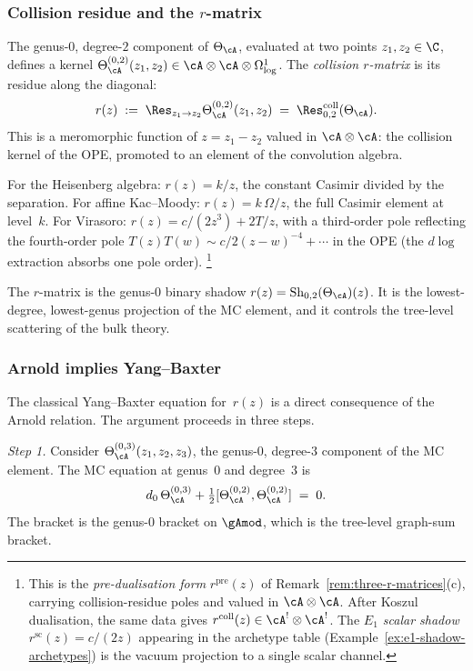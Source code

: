 \subsubsection*{Collision residue and the $r$-matrix}

The genus-$0$, degree-$2$ component of $\Theta_\cA$, evaluated
at two points $z_1,z_2\in\C$, defines a kernel
$\Theta_\cA^{(0,2)}(z_1,z_2)
\in\cA\otimes\cA\otimes\Omega^1_{\mathrm{log}}$.
The \emph{collision $r$-matrix} is its residue along the
diagonal:
\[
r(z)
\;:=\;
\Res_{z_1\to z_2}\Theta_\cA^{(0,2)}(z_1,z_2)
\;=\;
\Res^{\mathrm{coll}}_{0,2}(\Theta_\cA).
\]
This is a meromorphic function of $z=z_1-z_2$ valued in
$\cA\otimes\cA$: the collision kernel of the OPE, promoted to
an element of the convolution algebra.

For the Heisenberg algebra: $r(z)=k/z$, the constant Casimir
divided by the separation. For affine Kac--Moody:
$r(z)=k\,\Omega/z$, the full Casimir element at level~$k$. For Virasoro:
$r(z)=c/(2z^3)+2T/z$, with a third-order pole reflecting the
fourth-order pole $T(z)T(w)\sim c/2(z-w)^{-4}+\cdots$ in the OPE
(the $d\log$ extraction absorbs one pole order).%
\footnote{This is the \emph{pre-dualisation form}
$r^{\mathrm{pre}}(z)$ of
Remark~\textup{\ref{rem:three-r-matrices}}\textup{(c)}, carrying
collision-residue poles and valued in $\cA\otimes\cA$.
After Koszul dualisation, the same data gives
$r^{\mathrm{coll}}(z) \in \cA^!\otimes\cA^!$. The
\emph{$E_1$ scalar shadow} $r^{\mathrm{sc}}(z) = c/(2z)$
appearing in the archetype table
\textup{(}Example~\textup{\ref{ex:e1-shadow-archetypes})}
is the vacuum projection to a single scalar channel.}

The $r$-matrix is the genus-$0$ binary shadow
$r(z)=\mathrm{Sh}_{0,2}(\Theta_\cA)(z)$. It is the
lowest-degree, lowest-genus projection of the MC element, and
it controls the tree-level scattering of the bulk theory.

\subsubsection*{Arnold implies Yang--Baxter}

The classical Yang--Baxter equation for~$r(z)$ is a direct
consequence of the Arnold relation. The argument proceeds in
three steps.

\emph{Step 1.}\enspace
Consider $\Theta_\cA^{(0,3)}(z_1,z_2,z_3)$, the genus-$0$,
degree-$3$ component of the MC element. The MC equation at
genus~$0$ and degree~$3$ is
\begin{equation}\label{eq:mc-g0-a3-preface-supp}
d_0\,\Theta_\cA^{(0,3)}
+\tfrac{1}{2}[\Theta_\cA^{(0,2)},
\Theta_\cA^{(0,2)}]
\;=\;0.
\end{equation}
The bracket is the genus-$0$ bracket on $\gAmod$, which is the
tree-level graph-sum bracket.

